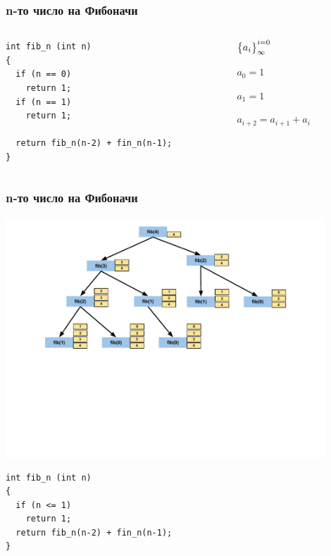 \documentclass{beamer}
\begin{document}
\begin{frame}[fragile]
\frametitle{n-то число на Фибоначи}


\begin{columns}[t]
  \begin{column}{0.7\textwidth}

\begin{lstlisting}
int fib_n (int n)
{
  if (n == 0)
    return 1;
  if (n == 1)
    return 1;

  return fib_n(n-2) + fin_n(n-1);
}
\end{lstlisting}


  \end{column}
  \begin{column}{0.3\textwidth}
\begin{flushleft}

  $\big{\{}a_i\big{\}}_\infty^{i=0}$

  \vspace{10px}

  $a_0 = 1$

  $a_1 = 1$

  $a_{i+2} = a_{i+1} + a_i$


\end{flushleft}
  \end{column}
\end{columns}

\end{frame}



\begin{frame}[fragile]
\frametitle{n-то число на Фибоначи}

\includegraphics[width=12cm]{images/fib_stack}

\vspace{-100px}

\begin{flushleft}
\begin{lstlisting}
int fib_n (int n)
{
  if (n <= 1)
    return 1;
  return fib_n(n-2) + fin_n(n-1);
}
\end{lstlisting}  
\end{flushleft}


\end{frame}
\end{document}
